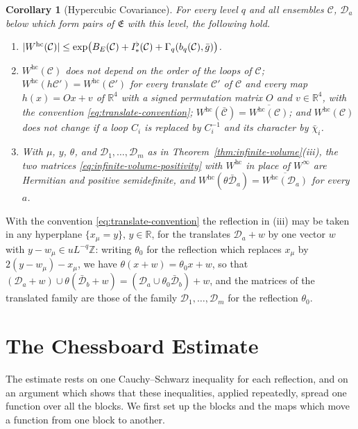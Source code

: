 \documentclass[11pt]{preprint}
\DeclarePairedDelimiter{\abs}{\lvert}{\rvert}
\numberwithin{equation}{section}
\newtheorem{corollary}[theorem]{Corollary}
\theoremstyle{definition}
\theoremstyle{remark}
\theoremstyle{plain}
\begin{document}
\begin{corollary}[Hypercubic Covariance]\label{cor:hypercubic}
For every level $q$ and all ensembles $\mathcal C$, $\mathcal D_a$ below which form pairs of $\mathfrak E$ with this level, the following hold.
\begin{enumerate}[label=(\roman*)]
\item $\abs{W^{\mathrm{hc}}(\mathcal C)} \leq \exp\bigl(B_E(\mathcal C) + I^\flat_*(\mathcal C) + \Gamma_q(b_q(\mathcal C), \bar g)\bigr)$.
\item $W^{\mathrm{hc}}(\mathcal C)$ does not depend on the order of the loops of $\mathcal C$; $W^{\mathrm{hc}}(h\mathcal C') = W^{\mathrm{hc}}(\mathcal C')$ for every translate $\mathcal C'$ of $\mathcal C$ and every map $h(x) = Ox + v$ of $\mathbb R^4$ with a signed permutation matrix $O$ and $v \in \mathbb R^4$, with the convention \eqref{eq:translate-convention}; $W^{\mathrm{hc}}(\bar{\mathcal C}) = \overline{W^{\mathrm{hc}}(\mathcal C)}$; and $W^{\mathrm{hc}}(\mathcal C)$ does not change if a loop $C_i$ is replaced by $C_i^{-1}$ and its character by $\bar\chi_i$.
\item With $\mu$, $y$, $\theta$, and $\mathcal D_1, \dots, \mathcal D_m$ as in Theorem~\ref{thm:infinite-volume}(iii), the two matrices \eqref{eq:infinite-volume-positivity} with $W^{\mathrm{hc}}$ in place of $W^\infty$ are Hermitian and positive semidefinite, and $W^{\mathrm{hc}}(\theta\bar{\mathcal D}_a) = \overline{W^{\mathrm{hc}}(\mathcal D_a)}$ for every $a$.
\end{enumerate}
\end{corollary}

With the convention \eqref{eq:translate-convention} the reflection in (iii) may be taken in any hyperplane $\{ x_\mu = y \}$, $y \in \mathbb R$, for the translates $\mathcal D_a + w$ by one vector $w$ with $y - w_\mu \in uL^{-q}\mathbb Z$: writing $\theta_0$ for the reflection which replaces $x_\mu$ by $2(y - w_\mu) - x_\mu$, we have $\theta(x + w) = \theta_0x + w$, so that $(\mathcal D_a + w) \cup \theta(\bar{\mathcal D}_b + w) = (\mathcal D_a \cup \theta_0\bar{\mathcal D}_b) + w$, and the matrices of the translated family are those of the family $\mathcal D_1, \dots, \mathcal D_m$ for the reflection $\theta_0$.

\section{The Chessboard Estimate}\label{sec:chessboard}

The estimate rests on one Cauchy--Schwarz inequality for each reflection, and on an argument which shows that these inequalities, applied repeatedly, spread one function over all the blocks. We first set up the blocks and the maps which move a function from one block to another.
\end{document}

